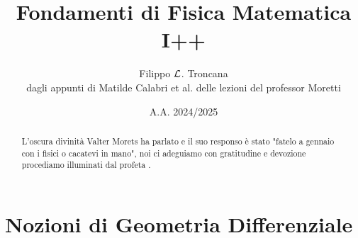 \documentclass{article}
\title{Fondamenti di Fisica Matematica I++}
\author{Filippo $\mathcal{L}$. Troncana \\ dagli appunti di Matilde Calabri et al. delle lezioni del professor Moretti}
\date{A.A. 2024/2025}
\begin{document}
\maketitle

\begin{abstract}
    L'oscura divinità Valter Morets ha parlato e il suo responso è stato "fatelo a gennaio con i fisici o cacatevi in mano", noi ci adeguiamo con gratitudine e devozione procediamo illuminati dal profeta \Nick.
\end{abstract}

\tableofcontents

\section{Nozioni di Geometria Differenziale}
\end{document}
